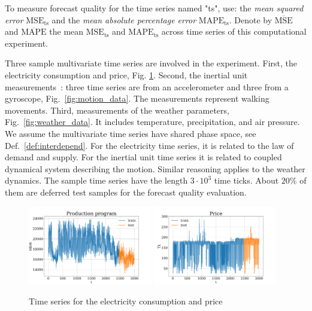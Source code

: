 \documentclass[referee, pdflatex, sn-mathphys-num]{sn-jnl}
\theoremstyle{definition}
\theoremstyle{plain}
\begin{document}
	To measure forecast quality for the time series named "ts", use: the \emph{mean squared error} $ \text{MSE}_{\text{ts}} $ and the \emph{mean absolute percentage error} $ \text{MAPE}_{\text{ts}} $. Denote by $ \overline{\text{MSE}} $ and $ \overline{\text{MAPE}} $ the mean $ \text{MSE}_{\text{ts}} $ and $ \text{MAPE}_{\text{ts}} $ across time series of this computational experiment.
	
	Three sample multivariate time series are involved in the experiment. First, the electricity consumption and price, Fig. \ref{fig:electr_data}. Second, the inertial unit measurements~\cite{accelerometryData}: three time series are from an accelerometer and three from a gyroscope, Fig.~\ref{fig:motion_data}. The measurements represent walking movements. Third, measurements of the weather parameters, Fig.~{\ref{fig:weather_data}}. It includes temperature, precipitation, and air pressure. We assume the multivariate time series have shared phase space, see Def.~\ref{def:interdepend}. For the electricity time series, it is related to the law of demand and supply. For the inertial unit time series it is related to coupled dynamical system describing the motion. Similar reasoning applies to the weather dynamics. The sample time series have the length $ 3 \cdot 10^3 $ time ticks. About $ 20\% $ of them are deferred test samples for the forecast quality evaluation.
	
	\begin{figure}[!htbp]
		\centering
		\includegraphics[width=0.48\textwidth, keepaspectratio]{Electricity_Production}
		\includegraphics[width=0.48\textwidth, keepaspectratio]{Electricity_Price}
		\caption{Time series for the electricity consumption and price}\label{fig:electr_data}
	\end{figure}
	
\end{document}

